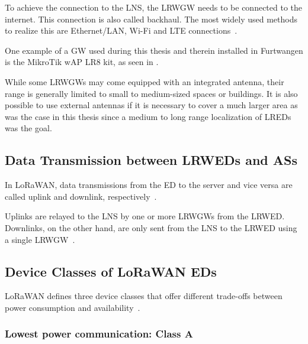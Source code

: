 To achieve the connection to the \ac{LNS}, the \acl{LRWGW} needs to be connected to the internet.
This connection is also called backhaul.
The most widely used methods to realize this are Ethernet/\ac{LAN}, Wi-Fi and \ac{LTE} connections~\cite{the_things_industries_bv_lorawan_nodate}.

One example of a \acl{GW} used during this thesis and therein installed in Furtwangen is the MikroTik wAP LR8 kit, as seen in .

While some \aclp{LRWGW} may come equipped with an integrated antenna, their range is generally limited to small to medium-sized spaces or buildings.
It is also possible to use external antennas if it is necessary to cover a much larger area as was the case in this thesis since a medium to long range localization of \aclp{LRED} was the goal.

\subsection{Data Transmission between \aclp{LRWED} and \aclp{AS}}

In LoRaWAN, data transmissions from the \acl{ED} to the server and vice versa are called uplink and downlink, respectively~\cite[p. 12]{lora_alliance_inc_lorawan_specification_2017}.

Uplinks are relayed to the \ac{LNS} by one or more \aclp{LRWGW} from the \acl{LRWED}.
Downlinks, on the other hand, are only sent from the \ac{LNS} to the \acl{LRWED} using a single \acl{LRWGW}~\cite[p. 12]{lora_alliance_inc_lorawan_specification_2017}.

\subsection{Device Classes of \acs{LoRaWAN} \aclp{ED}}\label{sec:device-classes}

\ac{LoRaWAN} defines three device classes that offer different trade-offs between power consumption and availability~\cite[p. 10]{lora_alliance_inc_lorawan_specification_2017}.

\subsubsection{Lowest power communication: Class A}

